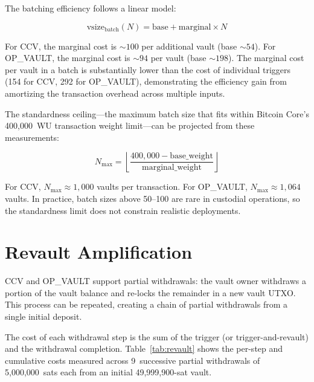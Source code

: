 The batching efficiency follows a linear model:

\begin{equation} \label{eq:batching}
\text{vsize}_{\text{batch}}(N) = \text{base} + \text{marginal} \times N
\end{equation}

\noindent
For CCV, the marginal cost is ${\sim}100$\vB{} per additional vault (base
${\sim}54$\vB{}). For OP\_VAULT, the marginal cost is ${\sim}94$\vB{} per vault
(base ${\sim}198$\vB{}). The marginal cost per vault in a batch is substantially
lower than the cost of individual triggers (154\vB{} for CCV, 292\vB{} for
OP\_VAULT), demonstrating the efficiency gain from amortizing the transaction
overhead across multiple inputs.

The standardness ceiling---the maximum batch size that fits within Bitcoin Core's
400{,}000~WU transaction weight limit---can be projected from these measurements:

\begin{equation} \label{eq:ceiling}
N_{\max} = \left\lfloor \frac{400{,}000 - \text{base\_weight}}
  {\text{marginal\_weight}} \right\rfloor
\end{equation}

\noindent
For CCV, $N_{\max} \approx 1{,}000$ vaults per transaction. For OP\_VAULT,
$N_{\max} \approx 1{,}064$ vaults. In practice, batch sizes above 50--100 are rare
in custodial operations, so the standardness limit does not constrain realistic
deployments.

\section{Revault Amplification} \label{se:revault_results}

CCV and OP\_VAULT support partial withdrawals: the vault owner withdraws a portion
of the vault balance and re-locks the remainder in a new vault UTXO. This process
can be repeated, creating a chain of partial withdrawals from a single initial
deposit.

The cost of each withdrawal step is the sum of the trigger (or trigger-and-revault)
and the withdrawal completion. Table~\ref{tab:revault} shows the per-step and
cumulative costs measured across 9~successive partial withdrawals of 5{,}000{,}000~sats
each from an initial 49{,}999{,}900-sat vault.

